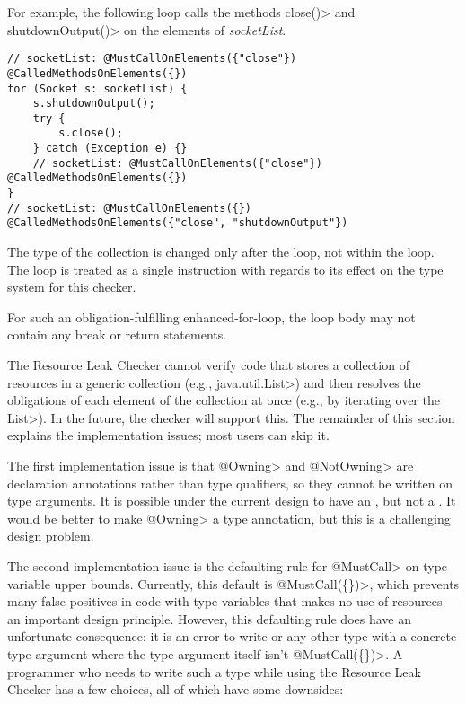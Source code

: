 For example, the following loop calls the methods \<close()> and \<shutdownOutput()> on the elements of \textit{socketList}.

\begin{verbatim}
// socketList: @MustCallOnElements({"close"}) @CalledMethodsOnElements({})
for (Socket s: socketList) {
    s.shutdownOutput();
    try {
        s.close();
    } catch (Exception e) {}
    // socketList: @MustCallOnElements({"close"}) @CalledMethodsOnElements({})
}
// socketList: @MustCallOnElements({}) @CalledMethodsOnElements({"close", "shutdownOutput"})
\end{verbatim}

The type of the collection is changed only after the loop, not within the
loop. The loop is treated as a single instruction with regards to its effect on
the type system for this checker.

For such an obligation-fulfilling enhanced-for-loop, the loop body may not
contain any break or return statements.



The Resource Leak Checker cannot verify code that stores a collection of
resources in a generic collection (e.g., \<java.util.List>) and then
resolves the obligations of each element of the collection at once (e.g.,
by iterating over the \<List>).  In the future, the checker will support
this.  The remainder of this section explains the implementation issues;
most users can skip it.

The first implementation issue is that \<@Owning> and \<@NotOwning> are
declaration annotations rather than type qualifiers, so they cannot be
written on type arguments. It is possible under the current design to have
an , but not a .
It would be better to make \<@Owning> a type annotation, but this is a
challenging design problem.

The second implementation issue is the defaulting rule for \<@MustCall> on
type variable upper bounds.  Currently, this default is \<@MustCall(\{\})>,
which prevents many false positives in code with type variables that makes
no use of resources --- an important design principle.
However, this defaulting rule does have an unfortunate consequence: it is
an error to write  or any other type with a concrete
type argument where the type argument itself isn't \<@MustCall(\{\})>. A programmer who
needs to write such a type while using the Resource Leak Checker has a few
choices, all of which have some downsides:

